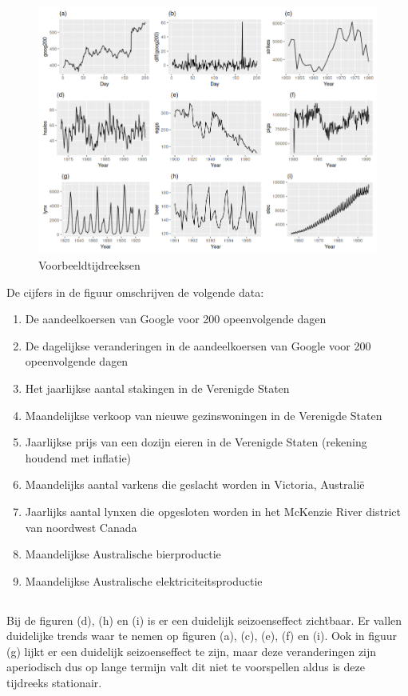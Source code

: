 \begin{figure}[!h]
    \centering
    \caption{Voorbeeldtijdreeksen~\autocite{Hyndman2018}}
    \label{fig:stationarity}
    \includegraphics[width=0.7\linewidth]{stationarity}
\end{figure}

De cijfers in de figuur omschrijven de volgende data:

\begin{enumerate}[label=(\,\alph*)\,]
    \item De aandeelkoersen van Google voor 200 opeenvolgende dagen
    \item De dagelijkse veranderingen in de aandeelkoersen van Google voor 200 opeenvolgende dagen
    \item Het jaarlijkse aantal stakingen in de Verenigde Staten
    \item Maandelijkse verkoop van nieuwe gezinswoningen in de Verenigde Staten
    \item Jaarlijkse prijs van een dozijn eieren in de Verenigde Staten (rekening houdend met inflatie)
    \item Maandelijks aantal varkens die geslacht worden in Victoria, Australi\"{e}
    \item Jaarlijks aantal lynxen die opgesloten worden in het McKenzie River district van noordwest Canada
    \item Maandelijkse Australische bierproductie
    \item Maandelijkse Australische elektriciteitsproductie
\end{enumerate}

\subsection{}

Bij de figuren (d), (h) en (i) is er een duidelijk seizoenseffect zichtbaar. Er vallen duidelijke trends waar te nemen op figuren (a), (c), (e), (f) en (i). Ook in figuur (g) lijkt er een duidelijk seizoenseffect te zijn, maar deze veranderingen zijn aperiodisch dus op lange termijn valt dit niet te voorspellen aldus is deze tijdreeks stationair.



